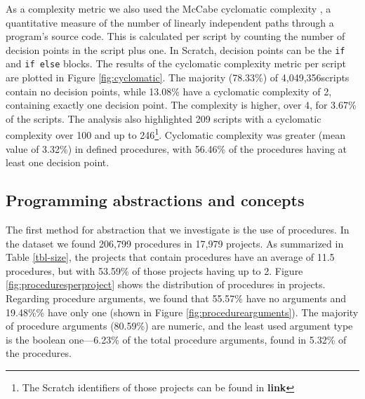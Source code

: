 \documentclass{sig-alternate}
\newcommand{\nscripts}{4,049,356}
\newcommand{\todo}[1]{\textbf{#1}}
\begin{document}
As a complexity metric we also used the McCabe cyclomatic complexity \cite{mcCabe76},  a quantitative measure of the number of linearly independent paths through a program's source code. This is calculated per script by counting the number of decision points in the script plus one. In Scratch, decision points can be the \texttt{if} and \texttt{if else} blocks. The results of the cyclomatic complexity metric per script are plotted in Figure \ref{fig:cyclomatic}. The majority (78.33\%) of \nscripts scripts contain no decision points, while 13.08\% have a cyclomatic complexity of 2, containing exactly one decision point. The complexity is higher, over 4, for 3.67\% of the scripts. The analysis also highlighted 209 scripts with a cyclomatic complexity over 100 and up to 246\footnote{The Scratch identifiers of those projects can be found in \todo{link}}. Cyclomatic complexity was greater (mean value of 3.32\%) in defined procedures, with 56.46\% of the procedures having at least one decision point.

\noindent
{}

\subsection{Programming abstractions and concepts}

The first method for abstraction that we investigate is the use of procedures. In the dataset we found 206,799 procedures in 17,979 projects. As summarized in Table \ref{tbl-size}, the projects that contain procedures have an average of 11.5 procedures, but with 53.59\% of those projects having up to 2. Figure \ref{fig:proceduresperproject} shows the distribution of procedures in projects. Regarding procedure arguments, we found that 55.57\% have no arguments and 19.48\%\% have only one (shown in Figure \ref{fig:procedurearguments}). The majority of procedure arguments (80.59\%) are numeric, and the least used argument type is the boolean one---6.23\% of the total procedure arguments, found in 5.32\% of the procedures.
\end{document}
